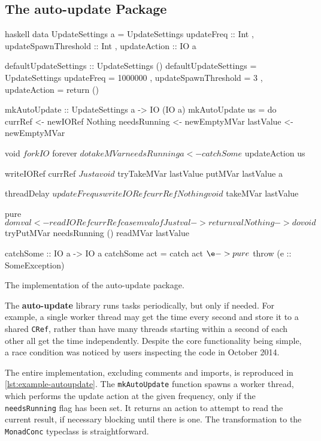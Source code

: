 \subsection{The auto-update Package}

\begin{listing}
  \centering
  \begin{cminted}{haskell}
data UpdateSettings a = UpdateSettings
    { updateFreq           :: Int
    , updateSpawnThreshold :: Int
    , updateAction         :: IO a
    }

defaultUpdateSettings :: UpdateSettings ()
defaultUpdateSettings = UpdateSettings
    { updateFreq           = 1000000
    , updateSpawnThreshold = 3
    , updateAction         = return ()
    }

mkAutoUpdate :: UpdateSettings a -> IO (IO a)
mkAutoUpdate us = do
    currRef      <- newIORef Nothing
    needsRunning <- newEmptyMVar
    lastValue    <- newEmptyMVar

    void $ forkIO $ forever $ do
        takeMVar needsRunning

        a <- catchSome $ updateAction us

        writeIORef currRef $ Just a
        void $ tryTakeMVar lastValue
        putMVar lastValue a

        threadDelay $ updateFreq us

        writeIORef currRef Nothing
        void $ takeMVar lastValue

    pure $ do
        mval <- readIORef currRef
        case mval of
            Just val -> return val
            Nothing -> do
                void $ tryPutMVar needsRunning ()
                readMVar lastValue

catchSome :: IO a -> IO a
catchSome act = catch act $
  \e -> pure $ throw (e :: SomeException)
  \end{cminted}
  \caption{The implementation of the auto-update package.}\label{lst:example-autoupdate}
\end{listing}

The \textbf{auto-update} library runs tasks periodically, but only if
needed.  For example, a single worker thread may get the time every
second and store it to a shared \verb|CRef|, rather than have many
threads starting within a second of each other all get the time
independently.  Despite the core functionality being simple, a race
condition was noticed by users inspecting the code in October 2014.

The entire implementation, excluding comments and imports, is
reproduced in \cref{lst:example-autoupdate}.  The \verb|mkAutoUpdate|
function spawns a worker thread, which performs the update action at
the given frequency, only if the \verb|needsRunning| flag has been
set.  It returns an action to attempt to read the current result, if
necessary blocking until there is one.  The transformation to the
\verb|MonadConc| typeclass is straightforward.

